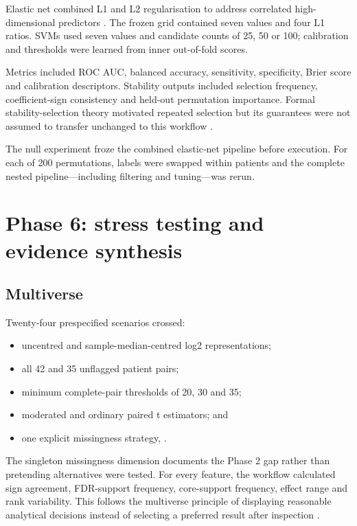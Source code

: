 Elastic net combined L1 and L2 regularisation to address correlated high-dimensional predictors \parencite{zou2005}. The frozen grid contained seven \texttt{} values and four L1 ratios. SVMs used seven \texttt{} values and candidate counts of 25, 50 or 100; calibration and thresholds were learned from inner out-of-fold scores.

Metrics included ROC AUC, balanced accuracy, sensitivity, specificity, Brier score and calibration descriptors. Stability outputs included selection frequency, coefficient-sign consistency and held-out permutation importance. Formal stability-selection theory motivated repeated selection but its guarantees were not assumed to transfer unchanged to this workflow \parencite{meinshausen2010}.

The null experiment froze the combined elastic-net pipeline before execution. For each of 200 permutations,  labels were swapped within patients and the complete nested pipeline—including filtering and tuning—was rerun.

\section{Phase 6: stress testing and evidence synthesis}
\label{sec:phase_6_stress_testing_and_evidence_synthesis}

\subsection{Multiverse}

Twenty-four prespecified scenarios crossed:

\begin{itemize}
\item uncentred and sample-median-centred log2 representations;
\item all 42 and 35 unflagged patient pairs;
\item minimum complete-pair thresholds of 20, 30 and 35;
\item moderated and ordinary paired t estimators; and
\item one explicit missingness strategy, .
\end{itemize}

The singleton missingness dimension documents the Phase 2 gap rather than pretending alternatives were tested. For every feature, the workflow calculated sign agreement, FDR-support frequency, core-support frequency, effect range and rank variability. This follows the multiverse principle of displaying reasonable analytical decisions instead of selecting a preferred result after inspection \parencite{steegen2016}.


